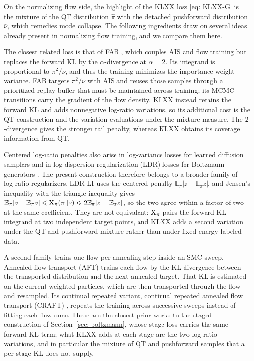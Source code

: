 \documentclass{article}
\begin{document}
On the normalizing flow side, the highlight of the KLXX loss \eqref{eq: KLXX-G} is the mixture of the QT distribution $\hat\pi$ with the detached pushforward distribution $\bar\nu$, which remedies mode collapse. The following ingredients draw on several ideas already present in normalizing flow training, and we compare them here.

The closest related loss is that of FAB \citep{midgley2022flow}, which couples AIS and flow training but replaces the forward KL by the $\alpha$-divergence at $\alpha=2$. Its integrand is proportional to $\pi^2/\nu$, and thus the training minimizes the importance-weight variance. FAB targets $\pi^2/\nu$ with AIS and reuses those samples through a prioritized replay buffer that must be maintained across training; its MCMC transitions carry the gradient of the flow density. KLXX instead retains the forward KL and adds nonnegative log-ratio variations, so its additional cost is the QT construction and the variation evaluations under the mixture measure. The $2$-divergence gives the stronger tail penalty, whereas KLXX obtains its coverage information from QT.

Centered log-ratio penalties also arise in log-variance losses for learned diffusion samplers \citep{richter2024improved} and in log-dispersion regularization (LDR) losses for Boltzmann generators \citep{schopmans2026ldr}. The present construction therefore belongs to a broader family of log-ratio regularizers. LDR-L1 uses the centered penalty $\mathbb E_\pi|z-\mathbb E_\pi z|$, and Jensen's inequality with the triangle inequality gives $\mathbb E_\pi|z-\mathbb E_\pi z|\leqslant\mathrm{X}_\pi(\pi\|\nu)\leqslant2\mathbb E_\pi|z-\mathbb E_\pi z|$, so the two agree within a factor of two at the same coefficient. They are not equivalent: $\mathrm{X}_\pi$ pairs the forward KL integrand at two independent target points, and KLXX adds a second variation under the QT and pushforward mixture rather than under fixed energy-labeled data.

A second family trains one flow per annealing step inside an SMC sweep. Annealed flow transport (AFT) \citep{arbel2021annealed} trains each flow by the KL divergence between the transported distribution and the next annealed target. That KL is estimated on the current weighted particles, which are then transported through the flow and resampled. Its continual repeated variant, continual repeated annealed flow transport (CRAFT) \citep{matthews2022craft}, repeats the training across successive sweeps instead of fitting each flow once. These are the closest prior works to the staged construction of Section~\ref{sec: boltzmann}, whose stage loss carries the same forward KL term; what KLXX adds at each stage are the two log-ratio variations, and in particular the mixture of QT and pushforward samples that a per-stage KL does not supply.
\end{document}
